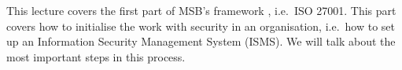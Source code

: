 This lecture covers the first part of MSB's framework \cite{%
  MSB2011itm,MSB2011sle,MSB2011p,MSB2011v,MSB2011r%
}, i.e.~ISO 27001.
This part covers how to initialise the work with security in an organisation, 
i.e.~how to set up an Information Security Management System (ISMS).
We will talk about the most important steps in this process.
